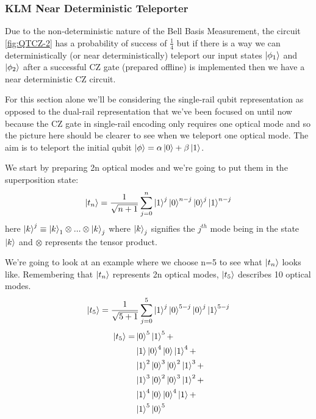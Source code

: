 \subsubsection{KLM Near Deterministic Teleporter}
Due to the non-deterministic nature of the Bell Basis Measurement, the circuit \cref{fig:QTCZ-2} has a probability of success of $\frac{1}{4}$ but if there is a way we can deterministically (or near deterministically) teleport our input states $\ket{\phi_1}$ and $\ket{\phi_2}$ after a successful CZ gate (prepared offline) is implemented then we have a near deterministic CZ circuit.
\par
For this section alone we'll be considering the single-rail qubit representation as opposed to the dual-rail representation that we've been focused on until now because the CZ gate in single-rail encoding only requires one optical mode and so the picture here should be clearer to see when we teleport one optical mode. The aim is to teleport the initial qubit $\ket{\phi} = \alpha\ket{0} + \beta\ket{1}$.
\par
We start by preparing 2n optical modes and we're going to put them in the superposition state:
    \begin{equation}
        \ket{t_n} = \frac{1}{\sqrt{n+1}}\sum\limits_{j=0}^{n}\ket{1}^j\ket{0}^{n-j}\ket{0}^j\ket{1}^{n-j}
        \label{eqn: QFT Teleporter EQ}
    \end{equation}
here $\ket{k}^j \equiv \ket{k}_1 \otimes...\otimes\ket{k}_j$ where $\ket{k}_j$ signifies the $j^{th}$ mode being in the state $\ket{k}$ and $\otimes$ represents the tensor product. 
\par
We're going to look at an example where we choose n=5 to see what $\ket{t_n}$ looks like. Remembering that $\ket{t_n}$ represents 2n optical modes, $\ket{t_5}$ describes 10 optical modes.
\begin{equation}
        \ket{t_5} = \frac{1}{\sqrt{5+1}}\sum\limits_{j=0}^5\ket{1}^j\ket{0}^{5-j}\ket{0}^j\ket{1}^{5-j}
    \end{equation}
    \begin{align} 
        \ket{t_5} =  & \ket{0}^{5}\ket{1}^5 
        + \\ & \ket{1}\ket{0}^{4}\ket{0}\ket{1}^{4} + 
 \\ & \ket{1}^2\ket{0}^{3}\ket{0}^2\ket{1}^{3} \label{t5:1} + \\ & \ket{1}^3\ket{0}^{2}\ket{0}^3\ket{1}^{2}\label{t5:2} + \\  & \ket{1}^4\ket{0}\ket{0}^4\ket{1} + \\ & \ket{1}^{5}\ket{0}^5  
 \label{eqn: t5 breakdown}
\end{align}
